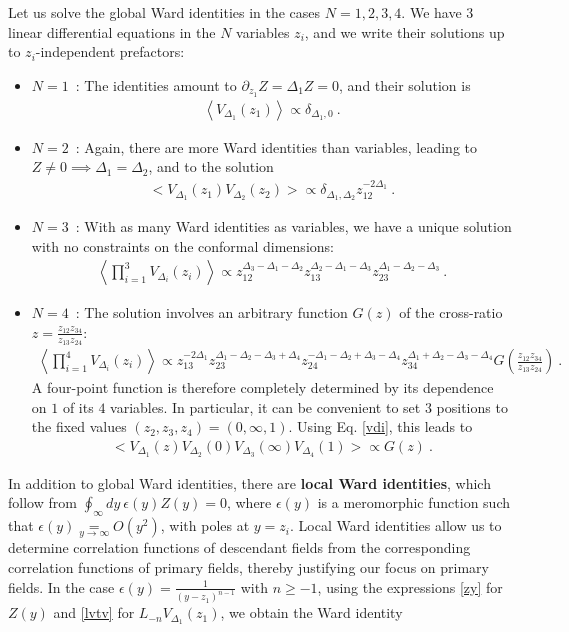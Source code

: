 \documentclass[12pt, a4paper]{article}
\theoremstyle{break}
\begin{document}
Let us solve the global Ward identities in the cases $N=1,2,3,4$. We have $3$ linear differential equations in the $N$ variables $z_i$, and we write their solutions up to $z_i$-independent prefactors:
\begin{itemize}
 \item $\boxed{N=1}$\ : The identities amount to $\partial_{z_1} Z = \Delta_1 Z=0$, and their solution is 
 \begin{align}
  \left<V_{\Delta_1}(z_1)\right>\propto \delta_{\Delta_1,0}\ . 
 \end{align}
 \item $\boxed{N=2}$\ : Again, there are more Ward identities than variables, leading to $Z\neq 0\implies \Delta_1=\Delta_2$, and to the solution
 \begin{align}
 \Big< V_{\Delta_1}(z_1)V_{\Delta_2}(z_2) \Big> \propto \delta_{\Delta_1,\Delta_2} z_{12}^{-2\Delta_1} \ .
 \label{2pt}
\end{align}
\item $\boxed{N=3}$\ : With as many Ward identities as variables, we have a unique solution with no constraints on the conformal dimensions:
\begin{align}
 \left< \prod_{i=1}^3 V_{\Delta_i}(z_i) \right> \propto z_{12}^{\Delta_3-\Delta_1-\Delta_2} z_{13}^{\Delta_2-\Delta_1-\Delta_3} z_{23}^{\Delta_1-\Delta_2-\Delta_3}\ .
 \label{3pt}
\end{align}
\item $\boxed{N=4}$\ : The solution involves an arbitrary function $G(z)$ of the cross-ratio $z=\frac{z_{12}z_{34}}{z_{13}z_{24}}$:
\begin{align}
 \left< \prod_{i=1}^4 V_{\Delta_i}(z_i) \right> 
 \propto z_{13}^{-2\Delta_1} z_{23}^{\Delta_1-\Delta_2-\Delta_3+\Delta_4} z_{24}^{-\Delta_1-\Delta_2+\Delta_3-\Delta_4} z_{34}^{\Delta_1+\Delta_2-\Delta_3-\Delta_4} G\left(\frac{z_{12}z_{34}}{z_{13}z_{24}}\right)\ .
 \label{4pt}
\end{align}
A four-point function is therefore completely determined by its dependence on $1$ of its $4$ variables. In particular, it can be convenient to set $3$ positions to the fixed values $(z_2,z_3,z_4)=(0,\infty,1)$. Using Eq. \eqref{vdi}, this leads to 
\begin{align}
 \Big< V_{\Delta_1}(z) V_{\Delta_2}(0)V_{\Delta_3}(\infty)V_{\Delta_4}(1) \Big> \propto G(z)\ . 
\end{align}
\end{itemize}
In addition to global Ward identities, there are \textbf{local Ward identities}, which follow from $\oint_\infty dy\ \epsilon(y)Z(y)=0$, where $\epsilon(y)$ is a meromorphic function such that $\epsilon(y)\underset{y\to\infty}{=}O(y^2)$, with poles at $y=z_i$. Local Ward identities allow us to determine correlation functions of descendant fields from the corresponding correlation functions of primary fields, thereby justifying our focus on primary fields. In the case $\epsilon(y) = \frac{1}{(y-z_1)^{n-1}}$ with $n\geq -1$, using the expressions \eqref{zy} for $Z(y)$ and \eqref{lvtv} for $L_{-n}V_{\Delta_1}(z_1)$, we obtain the Ward identity
\end{document}
